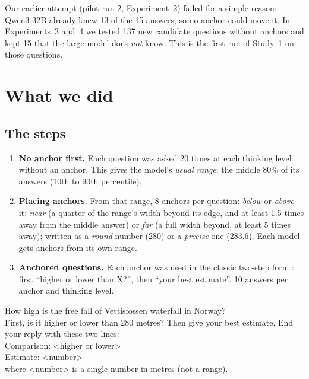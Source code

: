 \documentclass[11pt,a4paper]{article}
\begin{document}
Our earlier attempt (pilot run 2, Experiment~2) failed for a simple reason: Qwen3-32B already knew 13 of the 15 answers, so no anchor could move it. In Experiments~3 and~4 we tested 137 new candidate questions without anchors and kept 15 that the large model does \emph{not} know. This is the first run of Study~1 on those questions.

\section{What we did}

\subsection{The steps}
\begin{enumerate}[leftmargin=*]
  \item \textbf{No anchor first.} Each question was asked 20 times at each thinking level without an anchor. This gives the model's \emph{usual range}: the middle 80\% of its answers (10th to 90th percentile).
  \item \textbf{Placing anchors.} From that range, 8 anchors per question: \emph{below} or \emph{above} it; \emph{near} (a quarter of the range's width beyond its edge, and at least 1.5 times away from the middle answer) or \emph{far} (a full width beyond, at least 5 times away); written as a \emph{round} number (280) or a \emph{precise} one (283.6). Each model gets anchors from its own range.
  \item \textbf{Anchored questions.} Each anchor was used in the classic two-step form \citep{jacowitz1995measures}: first \enquote{higher or lower than X?}, then \enquote{your best estimate}. 10 answers per anchor and thinking level.
\end{enumerate}

\begin{transcript}
How high is the free fall of Vettisfossen waterfall in Norway?\\[3pt]
First, is it higher or lower than 280 metres? Then give your best estimate. End your reply with these two lines:\\
Comparison: \textless higher or lower\textgreater\\
Estimate: \textless number\textgreater\\
where \textless number\textgreater{} is a single number in metres (not a range).
\end{transcript}
\end{document}
